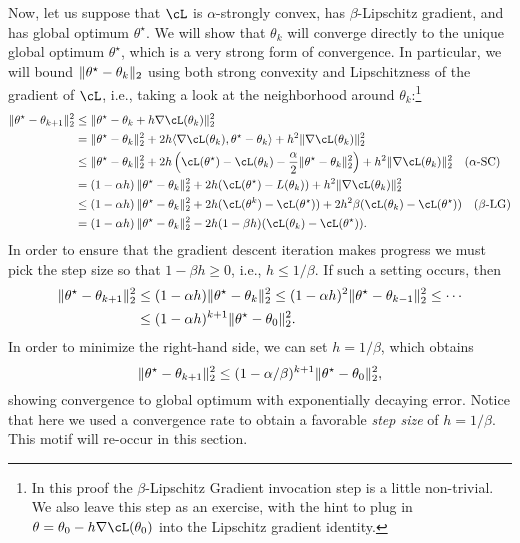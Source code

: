 \documentclass[../../book-main.tex]{subfiles}
\begin{document}
Now, let us suppose that \(\cL\) is \(\alpha\)-strongly convex, has \(\beta\)-Lipschitz gradient, and has global optimum \(\theta^{\star}\). We will show that \(\theta_{k}\) will converge directly to the unique global optimum \(\theta^{\star}\), which is a very strong form of convergence. In particular, we will bound \(\norm{\theta^{\star} - \theta_{k}}_{2}\) using both strong convexity and Lipschitzness of the gradient of \(\cL\), i.e., taking a look at the neighborhood around \(\theta_{k}\):\footnote{In this proof the \(\beta\)-Lipschitz Gradient invocation step is a little non-trivial. We also leave this step as an exercise, with the hint to plug in \(\theta = \theta_{0} - h\nabla \cL(\theta_{0})\) into the Lipschitz gradient identity.}
\begin{align}
    \norm{\theta^{\star} - \theta_{k + 1}}_{2}^{2}
    &\leq \norm{\theta^{\star} - \theta_{k} + h\nabla \cL(\theta_{k})}_{2}^{2} \\ 
    &= \norm{\theta^{\star} - \theta_{k}}_{2}^{2} + 2h\ip{\nabla \cL(\theta_{k})}{\theta^{\star} - \theta_{k}} + h^{2}\norm{\nabla \cL(\theta_{k})}_{2}^{2} \\ 
    &\leq \norm{\theta^{\star} - \theta_{k}}_{2}^{2} + 2h\bp{\cL(\theta^{\star}) - \cL(\theta_{k}) - \frac{\alpha}{2}\norm{\theta^{\star} - \theta_{k}}_{2}^{2}} + h^{2}\norm{\nabla \cL(\theta_{k})}_{2}^{2} \quad \text{(\(\alpha\)-SC)} \\
    &= \bp{1 - \alpha h}\norm{\theta^{\star} - \theta_{k}}_{2}^{2} + 2h(\cL(\theta^{\star}) - L(\theta_{k})) + h^{2}\norm{\nabla \cL(\theta_{k})}_{2}^{2} \\
    &\leq \bp{1 - \alpha h}\norm{\theta^{\star} - \theta_{k}}_{2}^{2} + 2h(\cL(\theta^{k}) - \cL(\theta^{\star})) + 2h^{2}\beta(\cL(\theta_{k}) - \cL(\theta^{\star})) \quad \text{(\(\beta\)-LG)} \\
    &= \bp{1 - \alpha h}\norm{\theta^{\star} - \theta_{k}}_{2}^{2} - 2h(1 - \beta h)(\cL(\theta_{k}) - \cL(\theta^{\star})).
\end{align}
In order to ensure that the gradient descent iteration makes progress we must pick the step size so that \(1 - \beta h \geq 0\), i.e., \(h \leq 1/\beta\). If such a setting occurs, then
\begin{align}
    \norm{\theta^{\star} - \theta_{k + 1}}_{2}^{2} 
    &\leq (1 - \alpha h)\norm{\theta^{\star} - \theta_{k}}_{2}^{2} \leq (1 - \alpha h)^{2}\norm{\theta^{\star} - \theta_{k - 1}}_{2}^{2} \leq \cdots \\ 
    &\leq (1 - \alpha h)^{k + 1}\norm{\theta^{\star} - \theta_{0}}_{2}^{2}.
\end{align}
In order to minimize the right-hand side, we can set \(h = 1/\beta\), which obtains 
\begin{equation}
    \norm{\theta^{\star} - \theta_{k + 1}}_{2}^{2} \leq (1 - \alpha/\beta)^{k + 1}\norm{\theta^{\star} - \theta_{0}}_{2}^{2},
\end{equation}
showing convergence to global optimum with exponentially decaying error. Notice that here we used a convergence rate to obtain a favorable \textit{step size} of \(h = 1/\beta\). This motif will re-occur in this section.
\end{document}
